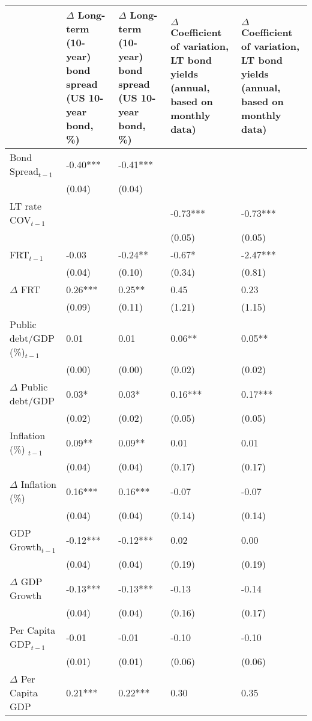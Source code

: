 \begingroup\tiny
\begin{tabular}{lp{3cm}p{3cm}p{3cm}p{3cm}}
  \hline
 & $\Delta$ Long-term (10-year) bond spread (US 10-year bond, \%) & $\Delta$ Long-term (10-year) bond spread (US 10-year bond, \%) & $\Delta$ Coefficient of variation, LT bond yields (annual, based on monthly data) & $\Delta$ Coefficient of variation, LT bond yields (annual, based on monthly data) \\ 
  \hline
Bond Spread$_{t-1}$ & -0.40*** & -0.41*** &  &  \\ 
   & (0.04) & (0.04) &  &  \\ 
  LT rate COV$_{t-1}$ &  &  & -0.73*** & -0.73*** \\ 
   &  &  & (0.05) & (0.05) \\ 
  FRT$_{t-1}$ & -0.03 & -0.24** & -0.67* & -2.47*** \\ 
   & (0.04) & (0.10) & (0.34) & (0.81) \\ 
  $\Delta$ FRT & 0.26*** & 0.25** & 0.45 & 0.23 \\ 
   & (0.09) & (0.11) & (1.21) & (1.15) \\ 
  Public debt/GDP (\%)$_{t-1}$ & 0.01 & 0.01 & 0.06** & 0.05** \\ 
   & (0.00) & (0.00) & (0.02) & (0.02) \\ 
  $\Delta$ Public debt/GDP & 0.03* & 0.03* & 0.16*** & 0.17*** \\ 
   & (0.02) & (0.02) & (0.05) & (0.05) \\ 
  Inflation (\%) $_{t-1}$ & 0.09** & 0.09** & 0.01 & 0.01 \\ 
   & (0.04) & (0.04) & (0.17) & (0.17) \\ 
  $\Delta$ Inflation (\%) & 0.16*** & 0.16*** & -0.07 & -0.07 \\ 
   & (0.04) & (0.04) & (0.14) & (0.14) \\ 
  GDP Growth$_{t-1}$ & -0.12*** & -0.12*** & 0.02 & 0.00 \\ 
   & (0.04) & (0.04) & (0.19) & (0.19) \\ 
  $\Delta$ GDP Growth & -0.13*** & -0.13*** & -0.13 & -0.14 \\ 
   & (0.04) & (0.04) & (0.16) & (0.17) \\ 
  Per Capita GDP$_{t-1}$ & -0.01 & -0.01 & -0.10 & -0.10 \\ 
   & (0.01) & (0.01) & (0.06) & (0.06) \\ 
  $\Delta$ Per Capita GDP & 0.21*** & 0.22*** & 0.30 & 0.35 \\ 

\end{tabular}
